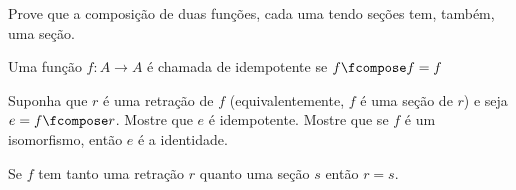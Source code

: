 \begin{homework}
    Prove que a composição de duas funções, cada uma tendo seções tem, também, uma seção.
\end{homework}

\begin{definition}
    Uma função $f : A \to A$ é chamada de idempotente se $f \fcompose f = f$
\end{definition}

\begin{exercise}
   Suponha que $r$ é uma retração de $f$ (equivalentemente, $f$ é uma seção de $r$) e seja $e = f \fcompose r$. Mostre que $e$ é idempotente. Mostre que se $f$ é um isomorfismo, então $e$ é a identidade. 
\end{exercise}

\begin{exercise}
    Se $f$ tem tanto uma retração $r$ quanto uma seção $s$ então $r = s$.
\end{exercise}
